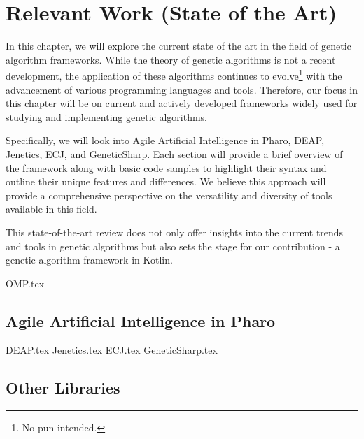\chapter{Relevant Work (State of the Art)}
\label{chap:sota}

  In this chapter, we will explore the current state of the art in the field of
  genetic algorithm frameworks.
  While the theory of genetic algorithms is not a recent development, the
  application of these algorithms continues to evolve\footnote{No pun intended.}
  with the advancement of various programming languages and tools.
  Therefore, our focus in this chapter will be on current and actively developed
  frameworks widely used for studying and implementing genetic algorithms.

  Specifically, we will look into Agile Artificial Intelligence in Pharo, DEAP,
  Jenetics, ECJ, and GeneticSharp.
  Each section will provide a brief overview of the framework along with basic
  code samples to highlight their syntax and outline their unique features and
  differences.
  We believe this approach will provide a comprehensive perspective on the
  versatility and diversity of tools available in this field.

  This state-of-the-art review does not only offer insights into the current
  trends and tools in genetic algorithms but also sets the stage for our
  contribution - a genetic algorithm framework in Kotlin.

  {OMP.tex}
  
  \section{Agile Artificial Intelligence in Pharo}
  \label{sec:sota:pharo}
    \Blindtext

  {DEAP.tex}
  {Jenetics.tex}
  {ECJ.tex}
  {GeneticSharp.tex}
  \section{Other Libraries}
  \label{sec:sota:other}
    \Blindtext
